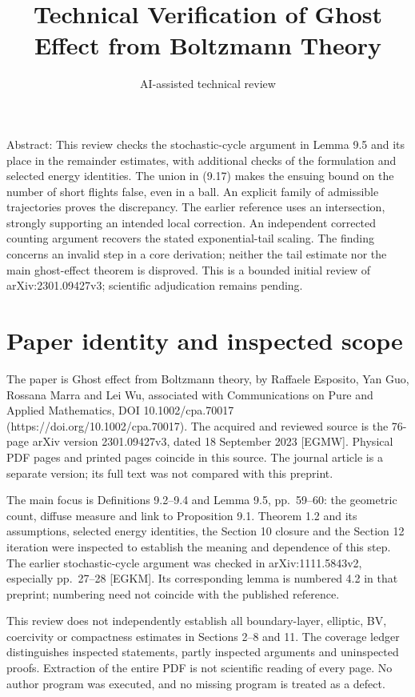 \documentclass[10pt]{article}
\title{Technical Verification of
Ghost Effect from Boltzmann Theory}
\author{AI-assisted technical review}
\date{}
\begin{document}
\maketitle
Abstract: This review checks the stochastic-cycle argument in Lemma 9.5 and its place in the remainder estimates, with additional checks of the formulation and selected energy identities. The union in (9.17) makes the ensuing bound on the number of short flights false, even in a ball. An explicit family of admissible trajectories proves the discrepancy. The earlier reference uses an intersection, strongly supporting an intended local correction. An independent corrected counting argument recovers the stated exponential-tail scaling. The finding concerns an invalid step in a core derivation; neither the tail estimate nor the main ghost-effect theorem is disproved. This is a bounded initial review of arXiv:2301.09427v3; scientific adjudication remains pending.\par
\section*{Paper identity and inspected scope}
The paper is Ghost effect from Boltzmann theory, by Raffaele Esposito, Yan Guo, Rossana Marra and Lei Wu, associated with Communications on Pure and Applied Mathematics, DOI 10.1002/cpa.70017 (https://doi.org/10.1002/cpa.70017). The acquired and reviewed source is the 76-page arXiv version 2301.09427v3, dated 18 September 2023 [EGMW]. Physical PDF pages and printed pages coincide in this source. The journal article is a separate version; its full text was not compared with this preprint.\par
The main focus is Definitions 9.2–9.4 and Lemma 9.5, pp. 59–60: the geometric count, diffuse measure and link to Proposition 9.1. Theorem 1.2 and its assumptions, selected energy identities, the Section 10 closure and the Section 12 iteration were inspected to establish the meaning and dependence of this step. The earlier stochastic-cycle argument was checked in arXiv:1111.5843v2, especially pp. 27–28 [EGKM]. Its corresponding lemma is numbered 4.2 in that preprint; numbering need not coincide with the published reference.\par
This review does not independently establish all boundary-layer, elliptic, BV, coercivity or compactness estimates in Sections 2–8 and 11. The coverage ledger distinguishes inspected statements, partly inspected arguments and uninspected proofs. Extraction of the entire PDF is not scientific reading of every page. No author program was executed, and no missing program is treated as a defect.\par
\end{document}
